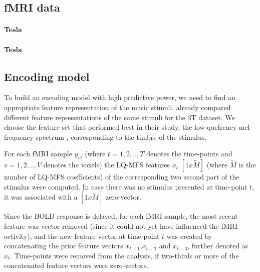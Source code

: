 \cite{HBI+14,HDH+2015}

\subsection*{fMRI data}

\paragraph{\unit[3]{Tesla}}
\paragraph{\unit[7]{Tesla}}

\subsection*{Encoding model}


To build an encoding model with high predictive power, we need to find an appropriate feature representation of the music stimuli. \cite{CTK+2012} already compared different feature representations of the same stimuli for the 3T dataset. We choose the feature set that performed best in their study, the low-quefrency mel-frequency spectrum \cite{HDH+2015}, corresponding to the timbre of the stimulus.   



For each f{MRI} sample $y_{vt}$ (where $t=1,2,..,T$ denotes the time-points and $v=1,2,..,V$ denotes the voxels) the LQ-MFS features $x_{t}$ $[1x\widetilde{M}]$ (where $\widetilde{M}$ is the number of LQ-MFS coefficients) of the corresponding two second part of the stimulus were computed. In case there was no stimulus presented at time-point $t$, it was associated with a $[1x\widetilde{M}]$ zero-vector. 

Since the BOLD response is delayed, for each f{MRI} sample, the most recent feature was vector removed (since it could not yet have influenced the f{MRI} activity), and the new feature vector at time-point $t$ was created by concatenating the prior feature vectors $x_{t-1}$,$x_{t-2}$ and $x_{t-3}$, further denoted as $x_{t}$. Time-points were removed from the analysis, if two-thirds or more of the concatenated feature vectors were zero-vectors.

